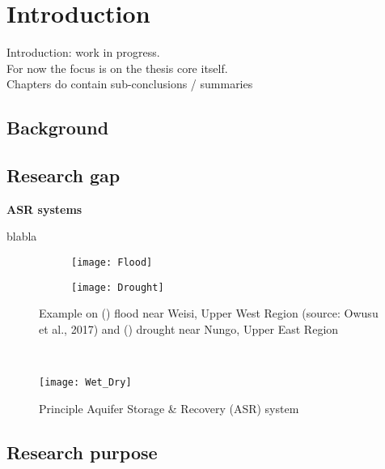 \chapter{Introduction}


Introduction: work in progress. \\

For now the focus is on the thesis core itself. \\
Chapters do contain sub-conclusions / summaries 


\section{Background}


\section{Research gap}

\textbf{ASR systems}

blabla
\begin{figure}[h!]
	\centering
	\begin{subfigure}[b]{0.5\linewidth}
		\centering\texttt{[image: Flood]}
		\captionsetup{justification=centering}		
		\caption{\label{fig:Flood}}
		\end{subfigure}%
	\begin{subfigure}[b]{0.5\linewidth}
        \centering\texttt{[image: Drought]}
		\captionsetup{justification=centering}		
		\caption{\label{fig:Drought}}
		\end{subfigure}
		\captionsetup{justification=centering}	
	\caption[Example on () flood near Weisi, Upper West Region and () drought near Nungo, Upper East Region]{Example on () flood near Weisi, Upper West Region (source: Owusu et al., 2017) and () drought near Nungo, Upper East Region} 
	\label{fig:Flood_Drought}
\end{figure} \\

\begin{figure}[h]
 \centering\texttt{[image: Wet\_Dry]}
 \captionsetup{justification=centering}
 \caption{Principle Aquifer Storage \& Recovery (ASR) system}
 \label{fig:ASR}
\end{figure}

\section{Research purpose}\

